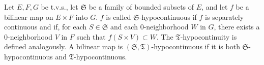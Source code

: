 Let $E, F, G$ be t.v.s., let $\mathfrak{S}$ be a family of bounded subsets of $E$, and let $f$ be a bilinear map on $E \times F$ into $G$. $f$ is called $\mathfrak{S}$-hypocontinuous if $f$ is separately continuous and if, for each $S \in \mathfrak{S}$ and each 0-neighborhood $W$ in $G$, there exists a 0-neighborhood $V$ in $F$ such that $f(S \times V) \subset W$. The $\mathfrak{T}$-hypocontinuity is defined analogously. A bilinear map is $(\mathfrak{S}, \mathfrak{T})$-hypocontinuous if it is both $\mathfrak{S}$-hypocontinuous and $\mathfrak{T}$-hypocontinuous.
